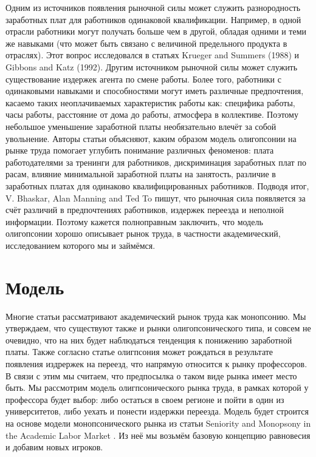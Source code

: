 \documentclass[a4paper, 12pt]{article}
\theoremstyle{definition}
\theoremstyle{plain}
\begin{document}
	Одним из источников появления рыночной силы может служить разнородность заработных плат для работников одинаковой квалификации. Например, в одной отрасли работники могут получать больше чем в другой, обладая одними и теми же навыками (что может быть связано с величиной предельного продукта в отраслях). Этот вопрос исследовался в статьях Krueger and Summers (1988) и Gibbons and Katz (1992).
Другим источником рыночной силы может служить существование издержек агента по смене работы. Более того, работники с одинаковыми навыками и способностями могут иметь различные предпочтения, касаемо таких неоплачиваемых характеристик работы как: специфика работы, часы работы, расстояние от дома до работы, атмосфера в коллективе. Поэтому небольшое уменьшение заработной платы необязательно влечёт за собой увольнение.
Авторы статьи объясняют, каким образом модель олигопсонии на рынке труда помогает углубить понимание различных феноменов: плата работодателями за тренинги для работников, дискриминация заработных плат по расам, влияние минимальной заработной платы на занятость, различие в заработных платах для одинаково квалифицированных работников. Подводя итог, V. Bhaskar, Alan Manning and Ted To пишут, что рыночная сила появляется за счёт различий в предпочтениях работников, издержек переезда и неполной информации. Поэтому кажется полноправным заключить, что модель олигопсонии хорошо описывает рынок труда, в частности академический, исследованием которого мы и займёмся.

\section{Модель}

Многие статьи рассматривают академический рынок труда как монопсонию. Мы утверждаем, что существуют также и рынки олигопсонического типа, и совсем не очевидно, что на них будет наблюдаться тенденция к понижению заработной платы. Также согласно статье \cite{2} олигпсония может рождаться в результате появления издрержек на переезд, что напрямую относится к рынку профессоров. В связи с этим мы считаем, что предпосылка о таком виде рынка имеет место быть.  Мы рассмотрим модель олигпсонического рынка труда, в рамках которой у профессора будет выбор: либо остаться в своем регионе и пойти в один из университетов, либо уехать и понести издержки переезда. Модель будет строится на основе модели монопсонического рынка из статьи Seniority and Monopsony in the Academic Labor Market \cite{1}. Из неё мы возьмём базовую концепцию равновесия и добавим новых игроков. 
\end{document}
